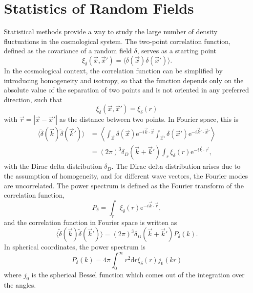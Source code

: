 \documentclass[12pt]{article}
\begin{document}
\section{Statistics of Random Fields}
Statistical methods provide a way to study the large number of density fluctuations in the cosmological system. The two-point correlation function, defined as the covariance of a random field $\delta$, serves as a starting point
\begin{equation}
    \xi_\delta\left(\vec{x}, \vec{x}'\right)= \langle \delta(\vec{x}) \delta(\vec{x}')\rangle.
\end{equation}
In the cosmological context, the correlation function can be simplified by introducing homogeneity and isotropy, so that the function depends only on the absolute value of the separation of two points and is not oriented in any preferred direction, such that
\begin{equation}
    \xi_\delta\left(\vec{x}, \vec{x}'\right) = \xi_\delta\left( r\right)
\end{equation}
with $\vec{r} = |\vec{x}-\vec{x}'|$ as the distance between two points. In Fourier space, this is
\begin{align*}
    \langle \tilde{\delta}(\vec{k}) \tilde{\delta}(\vec{k}') \rangle 
    &= \left\langle \int_{\vec{x}} \delta(\vec{x}) \mathrm{e}^{-i \vec{k} \cdot \vec{x}} 
    \int_{\vec{x}'} \delta(\vec{x}') \mathrm{e}^{-i \vec{k}' \cdot \vec{x}'} \right\rangle \\
    &= (2\pi)^3 \delta_D(\vec{k} + \vec{k}') \int_r \xi_\delta(r) \mathrm{e}^{-i \vec{k} \cdot \vec{r}},
\end{align*}
with the Dirac delta distribution $\delta_D$. The Dirac delta distribution arises due to the assumption of homogeneity, and for different wave vectors, the Fourier modes are uncorrelated. The power spectrum is defined as the Fourier transform of the correlation function,
\begin{equation}
    P_\delta = \int_r \xi_\delta(r) \mathrm{e}^{-i \vec{k} \cdot \vec{r}},
\end{equation}
and the correlation function in Fourier space is written as
\begin{equation}
    \langle \tilde{\delta}(\vec{k}) \tilde{\delta}(\vec{k}') \rangle = (2\pi)^3 \delta_D(\vec{k} + \vec{k}') P_\delta(k).
\end{equation}
In spherical coordinates, the power spectrum is
\begin{equation}
    P_\delta(k) = 4 \pi \int_0^\infty r^2 \mathrm{d}r \xi_\delta(r) j_0(kr)
\end{equation}
where $j_0$ is the spherical Bessel function which comes out of the integration over the angles. 
\end{document}
